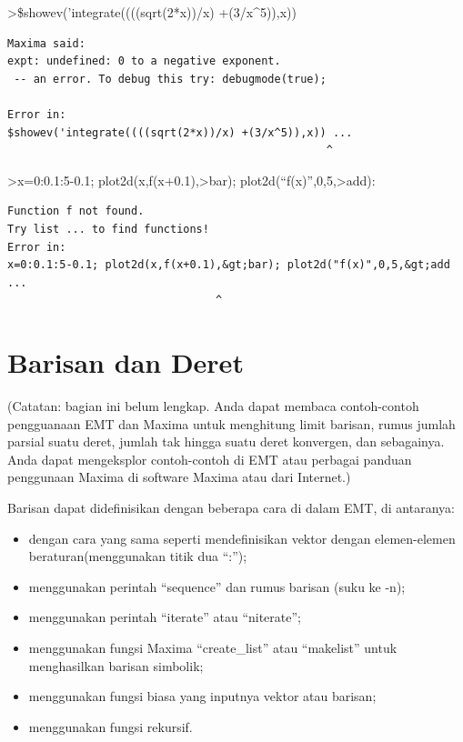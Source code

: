 \documentclass[
]{book}
\providecommand{\tightlist}{%
  \setlength{\itemsep}{0pt}\setlength{\parskip}{0pt}}
\begin{document}
\textgreater\$showev('integrate((((sqrt(2*x))/x) +(3/x\^{}5)),x))

\begin{verbatim}
Maxima said:
expt: undefined: 0 to a negative exponent.
 -- an error. To debug this try: debugmode(true);

Error in:
$showev('integrate((((sqrt(2*x))/x) +(3/x^5)),x)) ...
                                                 ^
\end{verbatim}

\textgreater x=0:0.1:5-0.1; plot2d(x,f(x+0.1),\textgreater bar); plot2d(``f(x)'',0,5,\textgreater add):

\begin{verbatim}
Function f not found.
Try list ... to find functions!
Error in:
x=0:0.1:5-0.1; plot2d(x,f(x+0.1),&gt;bar); plot2d("f(x)",0,5,&gt;add ...
                                ^
\end{verbatim}

\section{Barisan dan Deret}\label{barisan-dan-deret}

(Catatan: bagian ini belum lengkap. Anda dapat membaca contoh-contoh pengguanaan EMT dan Maxima untuk menghitung limit barisan, rumus jumlah parsial suatu deret, jumlah tak hingga suatu deret konvergen, dan sebagainya. Anda dapat mengeksplor contoh-contoh di EMT atau perbagai panduan penggunaan Maxima di software Maxima atau dari Internet.)

Barisan dapat didefinisikan dengan beberapa cara di dalam EMT, di antaranya:

\begin{itemize}
\tightlist
\item
  dengan cara yang sama seperti mendefinisikan vektor dengan elemen-elemen beraturan(menggunakan titik dua ``:'');
\item
  menggunakan perintah ``sequence'' dan rumus barisan (suku ke -n);
\item
  menggunakan perintah ``iterate'' atau ``niterate'';
\item
  menggunakan fungsi Maxima ``create\_list'' atau ``makelist'' untuk menghasilkan barisan simbolik;
\item
  menggunakan fungsi biasa yang inputnya vektor atau barisan;
\item
  menggunakan fungsi rekursif.
\end{itemize}
\end{document}
